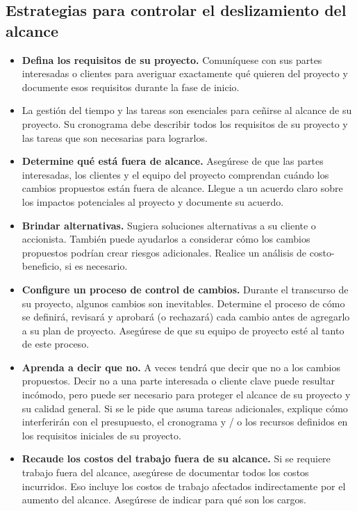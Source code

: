 \documentclass[10pt]{book}
\begin{document}
    \subsection{Estrategias para controlar el deslizamiento del alcance}
    \begin{itemize}
	\item \textbf{Defina los requisitos de su proyecto.} Comuníquese con sus partes interesadas o clientes para averiguar exactamente qué quieren del proyecto y documente esos requisitos durante la fase de inicio. 
	\item {} La gestión del tiempo y las tareas son esenciales para ceñirse al alcance de su proyecto. Su cronograma debe describir todos los requisitos de su proyecto y las tareas que son necesarias para lograrlos.
	\item \textbf{Determine qué está fuera de alcance.} Asegúrese de que las partes interesadas, los clientes y el equipo del proyecto comprendan cuándo los cambios propuestos están fuera de alcance. Llegue a un acuerdo claro sobre los impactos potenciales al proyecto y documente su acuerdo. 
	\item \textbf{Brindar  alternativas.} Sugiera soluciones alternativas a su cliente o accionista. También puede ayudarlos a considerar cómo los cambios propuestos podrían crear riesgos adicionales. Realice un análisis de costo-beneficio, si es necesario.
	\item \textbf{Configure un proceso de control de cambios.} Durante el transcurso de su proyecto, algunos cambios son inevitables. Determine el proceso de cómo se definirá, revisará y aprobará (o rechazará) cada cambio antes de agregarlo a su plan de proyecto. Asegúrese de que su equipo de proyecto esté al tanto de este proceso.
	\item \textbf{Aprenda a decir que no.} A veces tendrá que decir que no a los cambios propuestos. Decir no a una parte interesada o cliente clave puede resultar incómodo, pero puede ser necesario para proteger el alcance de su proyecto y su calidad general. Si se le pide que asuma tareas adicionales, explique cómo interferirán con el presupuesto, el cronograma y / o los recursos definidos en los requisitos iniciales de su proyecto. 
	\item \textbf{Recaude los  costos del trabajo fuera de su alcance.} Si se requiere trabajo fuera del alcance, asegúrese de  documentar todos los costos incurridos. Eso incluye los costos de trabajo afectados indirectamente por el aumento del alcance. Asegúrese de indicar para qué son los cargos. 
    \end{itemize}
\end{document}
